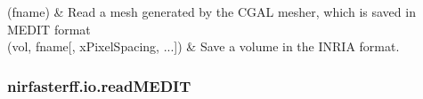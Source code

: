 \documentclass[letterpaper,10pt,english]{sphinxmanual}
\begin{document}
\begin{savenotes}\sphinxattablestart
\sphinxthistablewithglobalstyle
\sphinxthistablewithnovlinesstyle
\centering
\begin{tabulary}{\linewidth}[t]{}
\sphinxtoprule
\sphinxtableatstartofbodyhook
\sphinxAtStartPar
{\hyperref[\detokenize{_autosummary/nirfasterff.io.readMEDIT:nirfasterff.io.readMEDIT}]{}}(fname)
&
\sphinxAtStartPar
Read a mesh generated by the CGAL mesher, which is saved in MEDIT format
\\
\sphinxhline
\sphinxAtStartPar
{\hyperref[\detokenize{_autosummary/nirfasterff.io.saveinr:nirfasterff.io.saveinr}]{}}(vol, fname{[}, xPixelSpacing, ...{]})
&
\sphinxAtStartPar
Save a volume in the INRIA format.
\\
\sphinxbottomrule
\end{tabulary}
\sphinxtableafterendhook\par
\sphinxattableend\end{savenotes}

\sphinxstepscope


\subsubsection{nirfasterff.io.readMEDIT}
\label{\detokenize{_autosummary/nirfasterff.io.readMEDIT:nirfasterff-io-readmedit}}\label{\detokenize{_autosummary/nirfasterff.io.readMEDIT::doc}}
\end{document}
